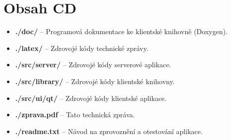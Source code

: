 \chapter{Obsah CD}

\begin{itemize}
\item \textbf{./doc/} -- Programová dokumentace ke klientské knihovně (Doxygen).
\item \textbf{./latex/} -- Zdrovojé kódy technické zprávy.
\item \textbf{./src/server/} -- Zdrovojé kódy serverové aplikace.
\item \textbf{./src/library/} -- Zdrovojé kódy klientské knihovny.
\item \textbf{./src/ui/qt/} -- Zdrovojé kódy klientské aplikace.
\item \textbf{./zprava.pdf} -- Tato technická zpráva.
\item \textbf{./readme.txt} -- Návod na zprovoznění a otestování aplikace.
\end{itemize}


